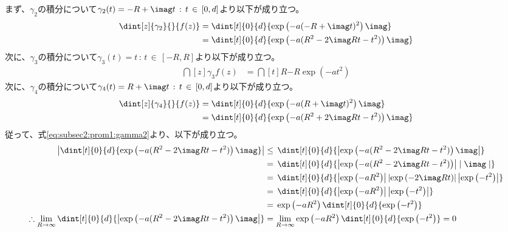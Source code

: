 \documentclass[dvipdfmx,titlepage, 11pt, a4paper]{jsarticle}%
\begin{document}
\begin{enumerate}[(1)]
    まず、$\gamma_2$の積分について$\gamma_2(t) = -R + \imag t\, : \, t\, \in \, \left[0, d\right]$より以下が成り立つ。
    \begin{align}
        \dint[z]{\gamma_2}{}{f(z)} 
        &= \dint[t]{0}{d}{\exp\left(-a(-R + \imag t)^2\right)\imag}\nonumber\\
        &= \dint[t]{0}{d}{\exp\left(-a(R^2 - 2\imag Rt - t^2)\right)\imag}\label{eq:subsec2:prom1:gamma2}
    \end{align}
    次に、$\gamma_3$の積分について$\gamma_3(t) = t\, : \, t\, \in \, \left[-R, R\right]$より以下が成り立つ。
    \begin{align}
        \dint[z]{\gamma_3}{}{f(z)} 
        &= \dint[t]{R}{-R}{\exp\left(-at^2\right)}\label{eq:subsec2:prom1:gamma3}
    \end{align}
    次に、$\gamma_4$の積分について$\gamma_4(t) = R + \imag t\, : \, t\, \in \, \left[0, d\right]$より以下が成り立つ。
    \begin{align}
        \dint[z]{\gamma_4}{}{f(z)} 
        &= \dint[t]{0}{d}{\exp\left(-a(R + \imag t)^2\right)\imag}\nonumber\\
        &= \dint[t]{0}{d}{\exp\left(-a(R^2 + 2\imag Rt - t^2)\right)\imag}\label{eq:subsec2:prom1:gamma4}
    \end{align}
    従って、式\eqref{eq:subsec2:prom1:gamma2}より、以下が成り立つ。
    \begin{align*}
        \left\lvert \dint[t]{0}{d}{\exp\left(-a(R^2 - 2\imag Rt - t^2)\right)\imag}\right\rvert
        &\leq \, \dint[t]{0}{d}{\left\lvert\exp\left(-a(R^2 - 2\imag Rt - t^2)\right)\imag\right\rvert}\\
        &= \, \dint[t]{0}{d}{\left\lvert\exp\left(-a(R^2 - 2\imag Rt - t^2)\right)\right\rvert\mid\imag\mid}\\
        &= \, \dint[t]{0}{d}{\left\lvert\exp\left(-aR^2\right)\right\rvert\left\lvert\exp\left(- 2\imag Rt\right)\right\rvert\left\lvert\exp\left(- t^2\right)\right\rvert}\\
        &= \, \dint[t]{0}{d}{\left\lvert\exp\left(-aR^2\right)\right\rvert\left\lvert\exp\left(- t^2\right)\right\rvert}\\
        &= \, \exp\left(-aR^2\right)\dint[t]{0}{d}{\exp\left(- t^2\right)}\\
        \therefore \lim_{R \to \infty} \dint[t]{0}{d}{\left\lvert\exp\left(-a(R^2 - 2\imag Rt - t^2)\right)\imag\right\rvert}
        &= \lim_{R \to \infty}\exp\left(-aR^2\right)\dint[t]{0}{d}{\exp\left(- t^2\right)} = 0
    \end{align*}

\end{enumerate}
\end{document}
